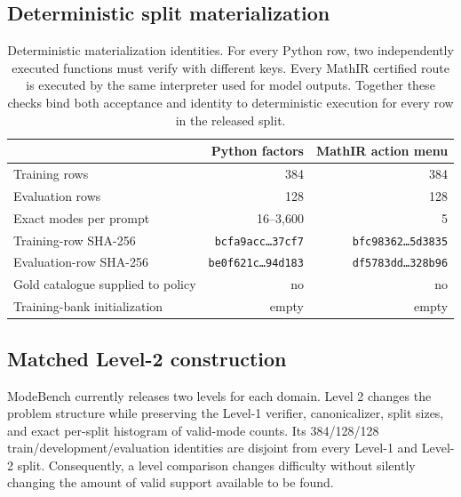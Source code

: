\documentclass{article}
\newcommand{\1}{\mathbf 1}
\theoremstyle{remark}
\theoremstyle{definition}
\theoremstyle{plain}
\begin{document}
\subsection{Deterministic split materialization}
\label{app:data-materialization}

\begin{table}[H]
\centering
\caption{Deterministic materialization identities. For every Python row, two
independently executed functions must verify with different keys. Every MathIR
certified route is executed by the same interpreter used for model outputs.
Together these checks bind both acceptance and identity to deterministic
execution for every row in the released split.}
\label{tab:materialization-identities}
\small
\begin{tabular}{@{}lrr@{}}
\toprule
& \textbf{Python factors} & \textbf{MathIR action menu} \\
\midrule
Training rows & 384 & 384 \\
Evaluation rows & 128 & 128 \\
Exact modes per prompt & 16--3,600 & 5 \\
Training-row SHA-256 & \texttt{bcfa9acc\ldots37cf7} & \texttt{bfc98362\ldots5d3835} \\
Evaluation-row SHA-256 & \texttt{be0f621c\ldots94d183} & \texttt{df5783dd\ldots328b96} \\
Gold catalogue supplied to policy & no & no \\
Training-bank initialization & empty & empty \\
\bottomrule
\end{tabular}
\end{table}

\subsection{Matched Level-2 construction}
\label{app:data-levels}

ModeBench currently releases two levels for each domain. Level 2 changes the
problem structure while preserving the Level-1 verifier, canonicalizer, split
sizes, and exact per-split histogram of valid-mode counts. Its 384/128/128
train/development/evaluation identities are disjoint from every Level-1 and
Level-2 split. Consequently, a level comparison changes difficulty without
silently changing the amount of valid support available to be found.
\end{document}
